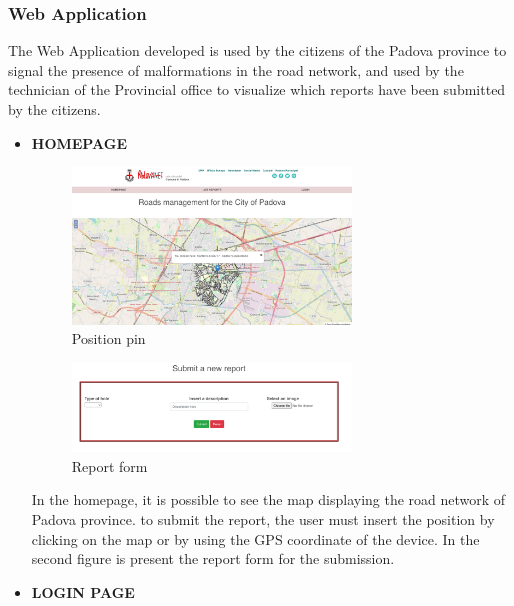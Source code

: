 \subsubsection{Web Application}
 The Web Application developed is used by the citizens of the Padova province to signal the presence of malformations in the road network, and used by the technician of the Provincial office to visualize which reports have been submitted by the citizens. 
 \begin{itemize}
    \newpage
     \item \textbf{HOMEPAGE}
      \begin{figure}[h]
        \centering
        \includegraphics[width=0.7\textwidth]{images/homepage.jpeg}
        \caption{Position pin}
       \end{figure}
       \begin{figure}[h]
        \centering
        \includegraphics[width=0.7\textwidth]{images/report.png}
        \caption{Report form}
       \end{figure}

 In the homepage, it is possible to see the map displaying the road network of Padova province.
 to submit the report, the user must insert the position by clicking on the map or by using the GPS coordinate of the device.
 In the second figure is present the report form for the submission.

\newpage
    \item \textbf{LOGIN PAGE}
    

\end{itemize}
